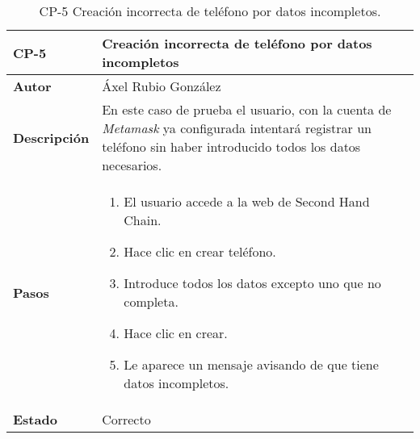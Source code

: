 \begin{table}[p]
	\centering
	\begin{tabularx}{\linewidth}{ p{} p{} }
		\toprule
		\textbf{CP-5}    & \textbf{Creación incorrecta de teléfono por datos incompletos}\\
		\toprule
		\textbf{Autor}                & Áxel Rubio González \\
		\textbf{Descripción}          & En este caso de prueba el usuario, con la cuenta de \textit{Metamask} ya configurada  intentará registrar un teléfono sin haber introducido todos los datos necesarios. \\
		\textbf{Pasos}             &
		\begin{enumerate}
			\def\labelenumi{\arabic{enumi}.}
			\tightlist
			\item El usuario accede a la web de Second Hand Chain.
                \item Hace clic en crear teléfono.
                \item Introduce todos los datos excepto uno que no completa.
                \item Hace clic en crear.
                \item Le aparece un mensaje avisando de que tiene datos incompletos.
		\end{enumerate}\\
		\textbf{Estado}          & Correcto \\
		\bottomrule
	\end{tabularx}
	\caption{CP-5 Creación incorrecta de teléfono por datos incompletos.}
\end{table}


